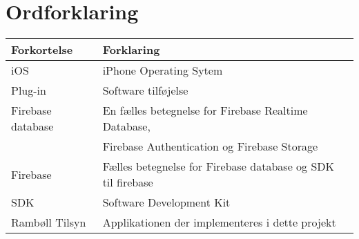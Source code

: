 \chapter*{Ordforklaring}

\begin{tabularx}{\textwidth}{l l X} \hline
	\textbf{Forkortelse}  & \textbf{Forklaring} \\ \hline
	iOS&  iPhone Operating Sytem& \\
	Plug-in&  Software tilføjelse& \\
	Firebase database& En fælles betegnelse for Firebase Realtime Database,\\
	& Firebase Authentication og Firebase Storage \\
	Firebase& Fælles betegnelse for Firebase database og SDK til firebase\\
	SDK& Software Development Kit\\
	Rambøll Tilsyn& Applikationen der implementeres i dette projekt\\
\end{tabularx}